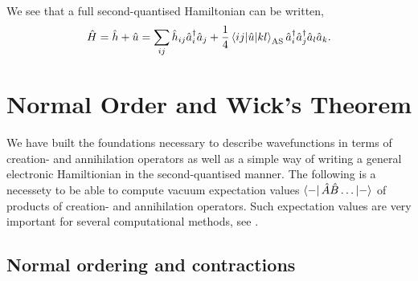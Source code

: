     We see that a full second-quantised Hamiltonian can be written,
    \begin{equation}
        \label{eq:second_quant_hamiltionian}
        \hat{H} = \hat{h} + \hat{u} 
        = \sum_{ij} \hat{h}_{ij}\hat{a}^\dagger_i \hat{a}_j
            + \frac{1}{4} \mel{ij}{\hat{u}}{kl}_\text{AS}
            \hat{a}^\dagger_i \hat{a}^\dagger_j \hat{a}_l \hat{a}_k.
    \end{equation}

\section{Normal Order and Wick's Theorem}

    We have built the foundations necessary to describe wavefunctions in terms
    of creation- and annihilation operators as well as a simple way of writing
    a general electronic Hamiltionian in the second-quantised manner. The following
    is a necessety to be able to compute vacuum expectation values 
    $\bra{-} \hat{A} \hat{B} \dots \ket{-}$ of products of creation- 
    and annihilation operators. Such expectation values are very important for 
    several computational methods, see \citeauthor{harris1992algebraic}\cite{harris1992algebraic}.

        \subsection{Normal ordering and contractions}


